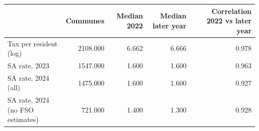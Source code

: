 \begin{tabular}{lrrrr}
\toprule
 & Communes & Median 2022 & Median later year & Correlation 2022 vs later year \\
\midrule
Tax per resident (log) & 2108.000 & 6.662 & 6.666 & 0.978 \\
SA rate, 2023 & 1547.000 & 1.600 & 1.600 & 0.963 \\
SA rate, 2024 (all) & 1475.000 & 1.600 & 1.600 & 0.927 \\
SA rate, 2024 (no FSO estimates) & 721.000 & 1.400 & 1.300 & 0.928 \\
\bottomrule
\end{tabular}
